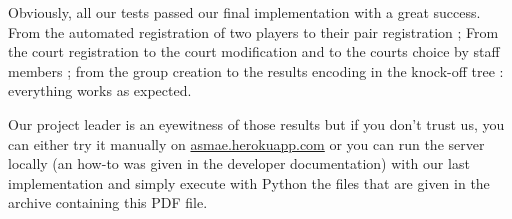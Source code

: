 Obviously, all our tests passed our final implementation with a great success.
From the automated registration of two players to their pair registration ; From
the court registration to the court modification and to the courts choice by
staff members ; from the group creation to the results encoding in the
knock-off tree : everything works as expected. \newline

Our project leader is an eyewitness of those results but if you don't trust us,
you can either try it manually on \url{asmae.herokuapp.com} or you can run
the server locally (an how-to was given in the developer documentation) with our
last implementation and simply execute with Python the files that are given in
the archive containing this PDF file.

